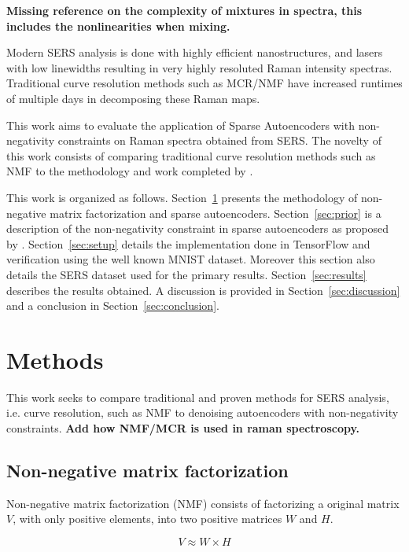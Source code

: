\documentclass{article}
\begin{document}
\textbf{Missing reference on the complexity of mixtures in spectra, this includes the nonlinearities when mixing.}

Modern SERS analysis is done with highly efficient nanostructures, and lasers with low linewidths resulting in very highly resoluted Raman intensity spectras. Traditional curve resolution methods such as MCR/NMF have increased runtimes of multiple days in decomposing these Raman maps. 

This work aims to evaluate the application of Sparse Autoencoders with non-negativity constraints on Raman spectra obtained from SERS. The novelty of this work consists of comparing traditional curve resolution methods such as NMF to the methodology and work completed by \cite{Hosseini-Asl2016}.

This work is organized as follows. Section~\ref{sec:methods} presents the methodology of non-negative matrix factorization and sparse autoencoders. Section~\ref{sec:prior} is a description of the non-negativity constraint in sparse autoencoders as proposed by \cite{Hosseini-Asl2016}. Section~\ref{sec:setup} details the implementation done in TensorFlow and verification using the well known MNIST dataset. Moreover this section also details the SERS dataset used for the primary results. Section~\ref{sec:results} describes the results obtained. A discussion is provided in Section~\ref{sec:discussion} and a conclusion in Section~\ref{sec:conclusion}.


\section{Methods}
\label{sec:methods}

This work seeks to compare traditional and proven methods for SERS analysis, i.e. curve resolution, such as NMF to denoising autoencoders with non-negativity constraints. 
\textbf{Add how NMF/MCR is used in raman spectroscopy.}

\subsection{Non-negative matrix factorization}

Non-negative matrix factorization (NMF) consists of factorizing a original matrix $V$, with only positive elements, into two positive matrices $W$ and $H$. \cite{Seung1999}


\begin{equation}
V \approx W \times H
\end{equation}
\end{document}
